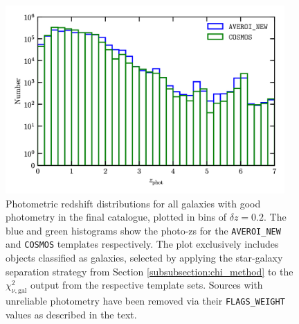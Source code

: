 \begin{figure}[tb]
\centering
\includegraphics[width=0.95\textwidth]{photoz_distribution_combined.png}
\caption[Total photometric redshift distribution]{Photometric redshift distributions for all galaxies with good photometry in the final \DESVIDEO catalogue, plotted in bins of $\delta z=0.2$. The blue and green histograms show the photo-zs for the \texttt{AVEROI\_NEW} and \texttt{COSMOS} templates respectively. The plot exclusively includes objects classified as galaxies, selected by applying the star-galaxy separation strategy from Section \ref{subsubsection:chi_method} to the $\chi^2_{\nu,\mathrm{gal}}$ output from the respective template sets. Sources with unreliable photometry have been removed via their \texttt{FLAGS\_WEIGHT} values as described in the text.}
\label{fig:photoz_distribution_total}
\end{figure}


